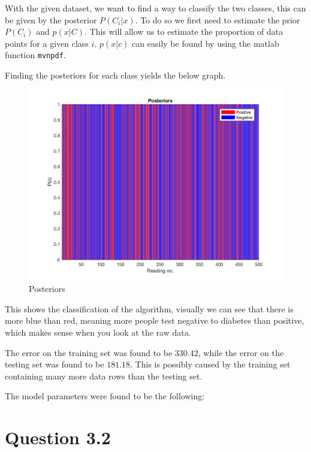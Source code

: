 With the given dataset, we want to find a way to classify the two classes, this can be given by the posterior $P(C_i|x)$. To do so we first need to estimate the prior $P(C_i)$ and $p(x|C)$. This will allow us to estimate the proportion of data points for a given class $i$.  $p(x|c)$ can easily be found by using the matlab function \texttt{mvnpdf}.

Finding the posteriors for each class yields the below graph.

\begin{figure}[H]
    \includegraphics[width=\linewidth]{../../pracs/week4/images/q1_posteriors}
    \centering
    \caption{Posteriors}
\end{figure}

This shows the classification of the algorithm, visually we can see that there is more blue than red, meaning more people test negative to diabetes than positive, which makes sense when you look at the raw data.


The error on the training set was found to be $330.42$, while the error on the testing set was found to be $181.18$. This is possibly caused by the training set containing many more data rows than the testing set.

The model parameters were found to be the following:



\section*{Question 3.2}


